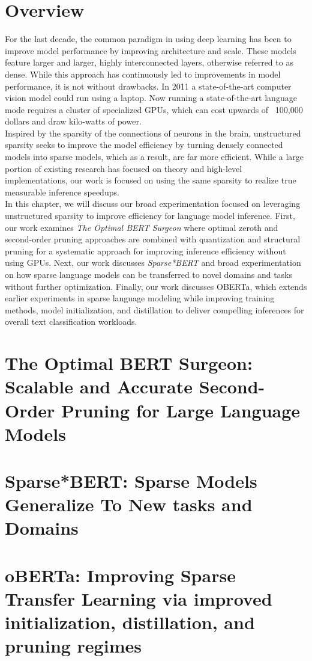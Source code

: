 \section{Overview}
For the last decade, the common paradigm in using deep learning has been to improve model performance by improving architecture and scale. These models feature larger and larger, highly interconnected layers, otherwise referred to as dense. While this approach has continuously led to improvements in model performance, it is not without drawbacks. In 2011 a state-of-the-art computer vision model could run using a laptop. Now running a state-of-the-art language mode requires a cluster of specialized GPUs, which can cost upwards of \ 100,000 dollars and draw kilo-watts of power. \\
Inspired by the sparsity of the connections of neurons in the brain, unstructured sparsity seeks to improve the model efficiency by turning densely connected models into sparse models, which as a result, are far more efficient. While a large portion of existing research has focused on theory and high-level implementations, our work is focused on using the same sparsity to realize true measurable inference speedups. \\
In this chapter, we will discuss our broad experimentation focused on leveraging unstructured sparsity to improve efficiency for language model inference. First, our work examines \textit{The Optimal BERT Surgeon} where optimal zeroth and second-order pruning approaches are combined with quantization and structural pruning for a systematic approach for improving inference efficiency without using GPUs. Next, our work discusses \textit{Sparse*BERT} and broad experimentation on how sparse language models can be transferred to novel domains and tasks without further optimization. Finally, our work discusses OBERTa, which extends earlier experiments in sparse language modeling while improving training methods, model initialization, and distillation to deliver compelling inferences for overall text classification workloads. 
\section{The Optimal BERT Surgeon: Scalable and Accurate Second-Order Pruning for Large Language Models}
 
\section{Sparse*BERT: Sparse Models Generalize To New tasks and Domains}

\section{oBERTa: Improving Sparse Transfer Learning via improved initialization, distillation, and pruning regimes}
\section{}

